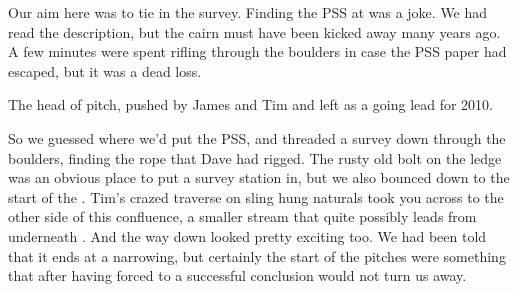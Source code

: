Our aim here was to tie in the survey. Finding the PSS at  was a joke. We had read the description, but the cairn must
have been kicked away many years ago. A few minutes were spent rifling
through the boulders in case the PSS paper had escaped, but it was a
dead loss.


\begin{marginfigure}
\checkoddpage \ifoddpage \forcerectofloat \else \forceversofloat \fi
\centering
 \caption{The head of \protect{} pitch, pushed by James and Tim and left as a going lead for 2010. }
 \label{below zimmer second pitch eggsplosive}
\end{marginfigure}


So we guessed where we'd put the PSS, and threaded a survey down through
the boulders, finding the rope that Dave had rigged. The rusty old bolt
on the ledge was an obvious place to put a survey station in, but we
also bounced down to the start of the . Tim's crazed
traverse on sling hung naturals took you across to the other side of
this confluence, a smaller stream that quite possibly leads from
underneath . And the way down looked pretty
exciting too. We had been told that it ends at a narrowing, but
certainly the start of the pitches were something that after having
forced  to a successful conclusion would not turn
us away.

